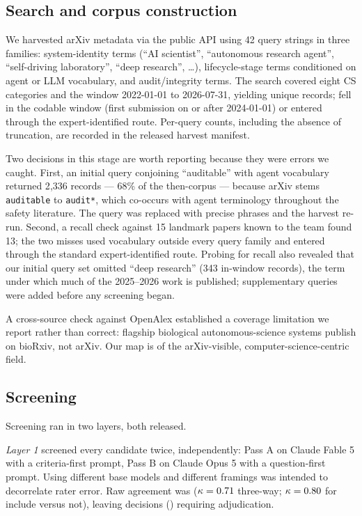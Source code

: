 \subsection{Search and corpus construction}

We harvested arXiv metadata via the public API using 42 query strings in three families:
system-identity terms (``AI scientist'', ``autonomous research agent'', ``self-driving
laboratory'', ``deep research'', \ldots), lifecycle-stage terms conditioned on agent or LLM
vocabulary, and audit/integrity terms. The search covered eight CS categories and the window
2022-01-01 to 2026-07-31, yielding \nHarvest{} unique records; \nScreened{} fell in the
codable window (first submission on or after 2024-01-01) or entered through the
expert-identified route. Per-query counts, including the absence of truncation, are recorded
in the released harvest manifest.

Two decisions in this stage are worth reporting because they were errors we caught. First, an
initial query conjoining ``auditable'' with agent vocabulary returned 2{,}336 records ---
68\% of the then-corpus --- because arXiv stems \texttt{auditable} to \texttt{audit*}, which
co-occurs with agent terminology throughout the safety literature. The query was replaced with
precise phrases and the harvest re-run. Second, a recall check against 15 landmark papers
known to the team found 13; the two misses used vocabulary outside every query family and
entered through the standard expert-identified route. Probing for recall also revealed that
our initial query set omitted ``deep research'' (343 in-window records), the term under which
much of the 2025--2026 work is published; supplementary queries were added before any
screening began.

A cross-source check against OpenAlex established a coverage limitation we report rather than
correct: flagship biological autonomous-science systems publish on bioRxiv, not arXiv. Our map
is of the arXiv-visible, computer-science-centric field.

\subsection{Screening}

Screening ran in two layers, both released.

\emph{Layer 1} screened every candidate twice, independently: Pass A on Claude Fable 5 with a
criteria-first prompt, Pass B on Claude Opus 5 with a question-first prompt. Using different
base models and different framings was intended to decorrelate rater error. Raw agreement was
\rawAgree{} ($\kappa = 0.71{}$ three-way; $\kappa = 0.80{}$ for include versus
not), leaving \nAdjudicate{} decisions (\pctAdjudicate{}) requiring adjudication.

